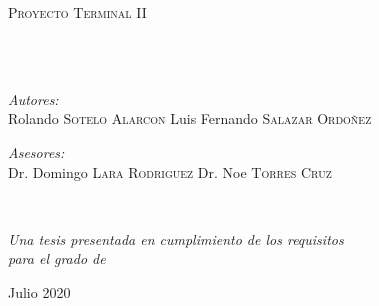 \documentclass[
	12pt, %
	spanish, %
	singlespacing, %
	headsepline, %
	]{MastersDoctoralThesis} %
\author{} %
\begin{document}
%
\frontmatter %

\pagestyle{plain} %


\begin{titlepage}
\begin{center}

\vspace*{.06\textheight}
{\scshape\LARGE \univname\par}\vspace{1.5cm} %
\textsc{\Large Proyecto Terminal II}\\[0.5cm] %

\HRule \\[0.4cm] %
{\huge \bfseries \ttitle\par}\vspace{0.4cm} %
\HRule \\[1.5cm] %

\begin{minipage}[t]{0.4\textwidth}
\begin{flushleft} \large
\emph{Autores:}\\
Rolando \textsc{Sotelo Alarcon} \newline
Luis Fernando \textsc{Salazar Ordoñez} \newline
\end{flushleft}
\end{minipage}
\begin{minipage}[t]{0.4\textwidth}
\begin{flushright} \large
\emph{Asesores:} \\
Dr. Domingo \textsc{Lara Rodriguez} \newline
Dr. Noe \textsc{Torres Cruz}
\end{flushright}
\end{minipage}\\[3cm]
 
\vfill

\large \textit{Una tesis presentada en cumplimiento de los requisitos \\para el grado de \degreename}\\[0.3cm] %
 
\vfill

{\large Julio 2020}\\[4cm] %
 
\vfill
\end{center}
\end{titlepage}
\end{document}

